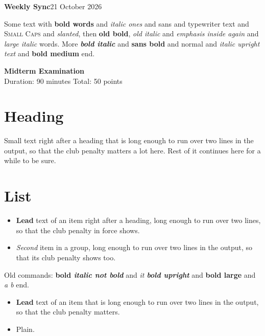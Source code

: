 \documentclass{article}
\begin{document}
{\Large\bfseries Weekly Sync}\hfill 21 October 2026

Some text with {\bfseries bold words} and {\itshape italic ones} and {\sffamily sans} and
{\ttfamily typewriter text} and {\scshape Small Caps} and {\slshape slanted}, then {\bf old bold},
{\it old italic} and {\em emphasis {\em inside} again} and {\large\itshape large italic} words.
More {\bfseries\itshape bold italic} and {\sffamily\bfseries sans bold} and {\normalfont normal} and
{\itshape italic {\upshape upright} text} and {\bfseries bold {\mdseries medium}} end.

\begin{center}
{\Large\bfseries Midterm Examination}\\[2pt]
Duration: 90 minutes \quad Total: 50 points
\end{center}

\section{Heading}
{\small Small text right after a heading that is long enough to run over two lines in the output, so that the club penalty matters a lot here.}
Rest of it continues here for a while to be sure.

\section{List}
\begin{itemize}
\item {\bfseries Lead} text of an item right after a heading, long enough to run over two lines, so that the club penalty in force shows.
\item {\itshape Second} item in a group, long enough to run over two lines in the output, so that its club penalty shows too.
\end{itemize}
Old commands: {\bfseries bold \it italic not bold} and {\itshape it \bf bold upright} and {\bfseries\Large bold large} and {\itshape a \small b} end.

\begin{itemize}
\item {\bfseries Lead} text of an item that is long enough to run over two lines in the output, so that the club penalty matters.
\item Plain.
\end{itemize}
\end{document}
